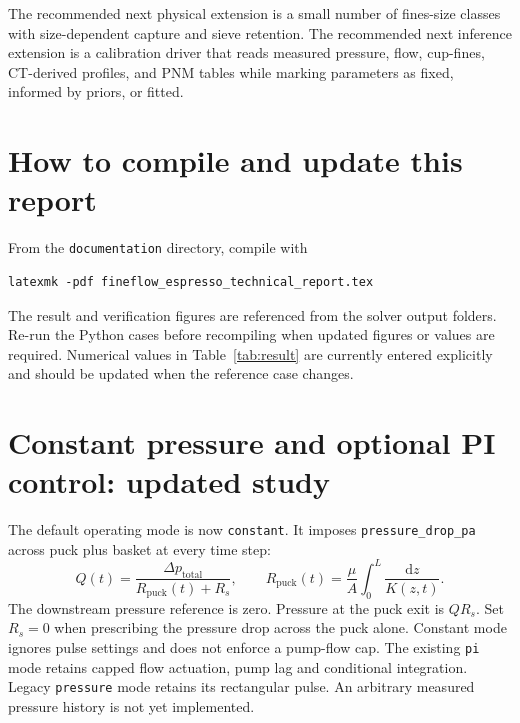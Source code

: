 \documentclass[11pt,a4paper]{article}
\newcommand{\code}[1]{\texttt{#1}}
\begin{document}
The recommended next physical extension is a small number of fines-size classes
with size-dependent capture and sieve retention. The recommended next inference
extension is a calibration driver that reads measured pressure, flow, cup-fines,
CT-derived profiles, and PNM tables while marking parameters as fixed, informed
by priors, or fitted.

\section{How to compile and update this report}

From the 
\code{documentation} directory, compile with
\begin{verbatim}
latexmk -pdf fineflow_espresso_technical_report.tex
\end{verbatim}
The result and verification figures are referenced from the solver output
folders. Re-run the Python cases before recompiling when updated figures or
values are required. Numerical values in Table~\ref{tab:result} are currently
entered explicitly and should be updated when the reference case changes.


\clearpage
\section{Constant pressure and optional PI control: updated study}
The default operating mode is now \texttt{constant}. It imposes
\texttt{pressure\_drop\_pa} across puck plus basket at every time step:
\[
Q(t)=\frac{\Delta p_{\mathrm{total}}}{R_{\mathrm{puck}}(t)+R_s},\qquad
R_{\mathrm{puck}}(t)=\frac{\mu}{A}\int_0^L\frac{\mathrm dz}{K(z,t)}.
\]
The downstream pressure reference is zero. Pressure at the puck exit is
$QR_s$. Set $R_s=0$ when prescribing the pressure drop across the puck alone.
Constant mode ignores pulse settings and does not enforce a pump-flow cap.
The existing \texttt{pi} mode retains capped flow actuation, pump lag and
conditional integration. Legacy \texttt{pressure} mode retains its rectangular
pulse. An arbitrary measured pressure history is not yet implemented.
\end{document}
